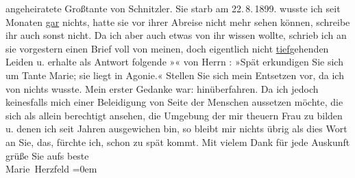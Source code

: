 \begin{ledgroupsized}[t]{13cm}
{{{                  angeheiratete Großtante von Schnitzler. Sie
                  starb am 22. 8. 1899.}}}\label{K_L02591-13h} wusste ich seit Monaten \uline{gar} nichts,
               hatte sie vor ihrer Abreise nicht mehr sehen können, schreibe ihr auch sonst nicht.
               Da ich aber auch etwas von ihr wissen wollte, {\pb}schrieb ich
               an sie vorgestern einen Brief voll von meinen, doch eigentlich nicht \uline{tief}gehenden Leiden u. erhalte als Antwort folgende
                  »\label{K_L02591-44v}\label{K_L02591-44h}« von Herrn \label{K_L02591-5v}\label{K_L02591-5h}: »Spät erkundigen Sie sich um Tante Marie; sie liegt in Agonie.« Stellen Sie sich mein
               Entsetzen vor, da ich von nichts wusste. Mein erster Gedanke war: hinüberfahren. Da
               ich {\pb}jedoch keinesfalls mich einer Beleidigung von Seite
               der Menschen aussetzen möchte, die sich als allein berechtigt ansehen, die Umgebung
               der mir theuern Frau zu bilden
               u. denen ich seit Jahren ausgewichen bin, so bleibt mir nichts übrig als dies Wort an
               Sie, das, fürchte ich, schon zu spät kommt. Mit vielem Dank für jede
               Auskunft\pend
           \pstart
           grüße Sie aufs beste {\\[\baselineskip]}\spacefill\mbox{Marie Herzfeld}\pend
           \leftskip=0em{}\endnumbering{}\end{ledgroupsized}  \newcommand{\dateiname}{L02591}\newcommand{\titel}{Marie Herzfeld an Arthur Schnitzler, 23. 8. 1899}\newcommand{\editorInnen}{Martin Anton Müller und Laura Untner}
      
